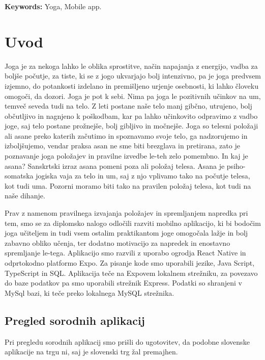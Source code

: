 \documentclass[a4paper, 12pt]{book}
\newcommand{\tkeywordsEn}{Yoga, Mobile app}
\newcommand{\clearemptydoublepage}{\newpage{\pagestyle{empty}\cleardoublepage}}
\begin{document}
\noindent\textbf{Keywords:} \tkeywordsEn.
\clearemptydoublepage

\mainmatter
\setcounter{page}{1}
\pagestyle{fancy}

\chapter{Uvod}
Joga je za nekoga lahko le oblika sprostitve, način napajanja z energijo, vadba za boljše počutje, za tiste, ki se z jogo ukvarjajo bolj intenzivno, pa je joga predvsem izjemno, do potankosti izdelano in premišljeno urjenje osebnosti, ki lahko človeku omogoči, da dozori. Joga je pot k sebi. Nima pa joga le pozitivnih učinkov na um, temveč seveda tudi na telo. 
Z leti postane naše telo manj gibčno, utrujeno, bolj občutljivo in nagnjeno k poškodbam, kar pa lahko učinkovito odpravimo z vadbo joge, saj telo postane prožnejše, bolj gibljivo in močnejše. Joga so telesni položaji ali asane preko katerih začutimo in spoznavamo svoje telo, ga nadzorujemo in izboljšujemo, vendar praksa asan ne sme biti brezglava in pretirana, zato je poznavanje joga položajev in pravilne izvedbe le-teh zelo pomembno. 
In kaj je asana? Sanskrtski izraz asana pomeni poza ali položaj telesa. Asana je psiho-somatska jogiska vaja za telo in um, saj z njo vplivamo tako na počutje telesa, kot tudi uma. Pozorni moramo biti tako na pravilen položaj telesa, kot tudi na naše dihanje. 

Prav z namenom pravilnega izvajanja položajev in spremljanjem napredka pri tem, smo se za diplomsko nalogo odločili razviti mobilno aplikacijo, ki bi bodočim joga učiteljem in tudi vsem ostalim praktikantom joge omogočala lažje in bolj zabavno obliko učenja, ter dodatno motivacijo za napredek in enostavno spremljanje le-tega. Aplikacijo smo razvili z uporabo ogrodja React Native in odprtokodno platformo Expo. Za pisanje kode smo uporabili jezike, Java Script, TypeScript in SQL. Aplikacija teče na Expovem lokalnem strežniku, za povezavo do baze podatkov pa smo uporabili strežnik Express. Podatki so shranjeni v MySql bazi, ki teče preko lokalnega MySQL strežnika.

\section{Pregled sorodnih aplikacij}
Pri pregledu sorodnih aplikacij smo prišli do ugotovitev, da podobne slovenske aplikacije na trgu ni, saj je slovenski trg žal premajhen.
\end{document}
